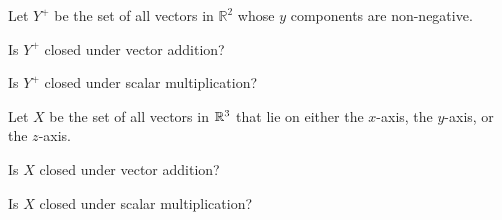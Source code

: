\documentclass{ximera}
\begin{document}
\begin{problem}\label{pr:Y^+}
Let $Y^+$ be the set of all vectors in $\mathbb{R}^2$ whose $y$ components are non-negative.    
 \begin{problem}
 Is $Y^+$ closed under vector addition?
 
 \begin{multipleChoice}
 \end{multipleChoice}
 
 \end{problem}
 
 \begin{problem}
 Is $Y^+$ closed under scalar multiplication?
 
  \begin{multipleChoice}
 \end{multipleChoice}
 
   \end{problem}
\end{problem}


\begin{problem}\label{pr:R^3axes}
 Let $X$ be the set of all vectors in $\mathbb{R}^3$ that lie on either the $x$-axis, the $y$-axis, or the $z$-axis.    
 	\begin{problem}
  Is $X$ closed under vector addition?
  
  \begin{multipleChoice}
 \end{multipleChoice}
 
 	\end{problem}
 	\begin{problem}
 Is $X$ closed under scalar multiplication?
 
 \begin{multipleChoice}
 \end{multipleChoice}
 	\end{problem}
 \end{problem}
\end{document}
